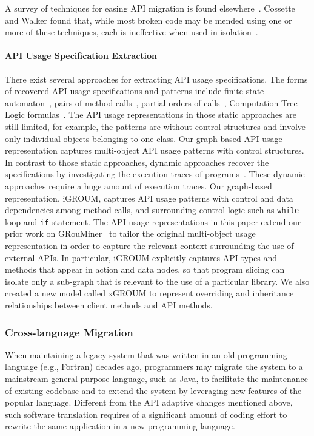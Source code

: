 \documentclass[runningheads,a4paper]{llncs}
\newcommand{\codefont}[1]{\footnotesize{\texttt{#1}}\normalsize}
\begin{document}
A survey of techniques for easing API migration is found elsewhere~\cite{cossette2012}. Cossette and Walker found that, while most broken code may be mended using one or more of these techniques, each is ineffective when used in isolation~\cite{cossette2012}.  

\paragraph{API Usage Specification Extraction} 
There exist several approaches for extracting API usage specifications. The forms of recovered API usage specifications and patterns include finite state automaton~\cite{zeller07,haozhong09}, pairs of method calls~\cite{dynamine05,williams-tse05}, partial orders of calls~\cite{mapo-fse07,taoxie-ase09}, Computation Tree Logic formulas~\cite{zeller-ase09}. The API usage representations in those static approaches are still limited, for example, the patterns are without control structures and involve only individual objects belonging to one class. Our graph-based API usage representation captures multi-object API usage patterns with control structures. In contrast to those static approaches, dynamic approaches recover the specifications by investigating the execution traces of programs~\cite{javert08,yang-icse06,shoham-issta07,ramanathan-isce07,mike-ase09}.  These dynamic approaches require a huge amount of execution traces.  Our graph-based representation, iGROUM, captures API usage patterns with control and data dependencies among method calls, and surrounding control logic such as \codefont{while} loop and \codefont{if} statement. 
The API usage representations in this paper extend our prior work on GRouMiner~\cite{fse09} to tailor the original multi-object usage representation in order to capture the relevant context surrounding the use of external APIs. In particular, iGROUM explicitly captures API types and methods that appear in action and data nodes, so that program slicing can isolate only a sub-graph that is relevant to the use of a particular library. We also created a new model called xGROUM to represent overriding and inheritance relationships between client methods and API methods. 


\subsubsection{Cross-language Migration} 
When maintaining a legacy system that was written in an old programming language (e.g., Fortran) decades ago, programmers may migrate the system to a mainstream general-purpose language, such as Java, to facilitate the maintenance of existing codebase and to extend the system by leveraging new features of the popular language. Different from the API adaptive changes mentioned above, such software translation requires of a significant amount of coding effort to rewrite the same application in a new programming language.
\end{document}
